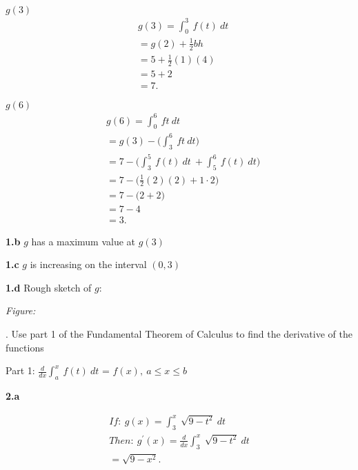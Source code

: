 \documentclass{report}
\begin{document}
   $g(3)$
   \begin{align*}
       &g(3) = \int_{0}^{3}\ f(t)\ dt \\
       &= g(2) + \frac{1}{2}bh \\
       &=5 + \frac{1}{2}(1)(4) \\
       &=5+2 \\
       &=7
   .\end{align*}
   \bigbreak \noindent 

   $g(6)$
   \begin{align*}
       &g(6) = \int_{0}^{6}\ ft\ dt \\
       &= g(3) - \bigg(\int_{3}^{6}\ ft\ dt\bigg) \\
       &= 7 - \bigg(\int_{3}^{5}\ f(t)\ dt\ + \int_{5}^{6}\ f(t)\ dt\bigg) \\
       &= 7 - \bigg(\frac{1}{2}(2)(2) + 1\cdot 2\bigg) \\
        &= 7- \bigg(2 + 2\bigg) \\
        &= 7- 4 \\
        &= 3
   .\end{align*}

   \pagebreak \bigbreak \noindent 
   \textbf{1.b} $g$ has a maximum value at $g(3)$

   \bigbreak \noindent 
   \textbf{1.c} $g$ is increasing on the interval $(0,3) $

   \bigbreak \noindent 
   \textbf{1.d} Rough sketch of $g$:
   \bigbreak \noindent 

   \textit{Figure:}
    \begin{figure}[ht]
        \centering
        \label{fig:roughsketch}
    \end{figure}
    \bigbreak {}. Use part 1 of the Fundamental Theorem of Calculus to find the derivative of the functions
    \bigbreak \noindent 
        \begin{remark}
       Part 1: $\frac{d}{dx}\int_{a}^{x}\ f(t)\ dt $ = $f(x),\ a \leq x \leq b $ 
    \end{remark}


    \bigbreak \noindent 
    \textbf{2.a} 
    \bigbreak \noindent 
    
    \begin{align*}
        If:\ g(x) = \int_{3}^{x}\ \sqrt{9-t^{2}}\ dt \\
        Then:\ g^{\prime}(x) = \frac{d}{dx}\int_{3}^{x}\ \sqrt{9-t^{2}}\ dt \\
        =\sqrt{9-x^{2}}
    .\end{align*}
\end{document}
